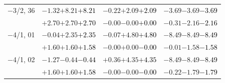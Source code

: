 \documentclass[compress]{beamer}
\begin{document}
\begin{frame}
\begin{tabular}{r | c | c | c}
$-$3/2, 36 & $-1.32$\hspace{0.1 cm}$+8.21$\hspace{0.1 cm}\textcolor{black}{$+8.21$} & $-0.22$\hspace{0.1 cm}$+2.09$\hspace{0.1 cm}\textcolor{black}{$+2.09$} & $-3.69$\hspace{0.1 cm}$-3.69$\hspace{0.1 cm}\textcolor{black}{$-3.69$} \\
           & $+2.70$\hspace{0.1 cm}$+2.70$\hspace{0.1 cm}\textcolor{black}{$+2.70$} & $-0.00$\hspace{0.1 cm}$-0.00$\hspace{0.1 cm}\textcolor{black}{$+0.00$} & $-0.31$\hspace{0.1 cm}$-2.16$\hspace{0.1 cm}\textcolor{black}{$-2.16$} \\
$-$4/1, 01 & $-0.04$\hspace{0.1 cm}$+2.35$\hspace{0.1 cm}\textcolor{black}{$+2.35$} & $-0.07$\hspace{0.1 cm}$+4.80$\hspace{0.1 cm}\textcolor{black}{$+4.80$} & $-8.49$\hspace{0.1 cm}$-8.49$\hspace{0.1 cm}\textcolor{black}{$-8.49$} \\
           & $+1.60$\hspace{0.1 cm}$+1.60$\hspace{0.1 cm}\textcolor{black}{$+1.58$} & $-0.00$\hspace{0.1 cm}$+0.00$\hspace{0.1 cm}\textcolor{black}{$-0.00$} & $-0.01$\hspace{0.1 cm}$-1.58$\hspace{0.1 cm}\textcolor{black}{$-1.58$} \\
$-$4/1, 02 & $-1.27$\hspace{0.1 cm}$-0.44$\hspace{0.1 cm}\textcolor{black}{$-0.44$} & $+0.36$\hspace{0.1 cm}$+4.35$\hspace{0.1 cm}\textcolor{black}{$+4.35$} & $-8.49$\hspace{0.1 cm}$-8.49$\hspace{0.1 cm}\textcolor{black}{$-8.49$} \\
           & $+1.60$\hspace{0.1 cm}$+1.60$\hspace{0.1 cm}\textcolor{black}{$+1.58$} & $-0.00$\hspace{0.1 cm}$-0.00$\hspace{0.1 cm}\textcolor{black}{$-0.00$} & $-0.22$\hspace{0.1 cm}$-1.79$\hspace{0.1 cm}\textcolor{black}{$-1.79$} \\

\end{tabular}
\end{frame}
\end{document}
